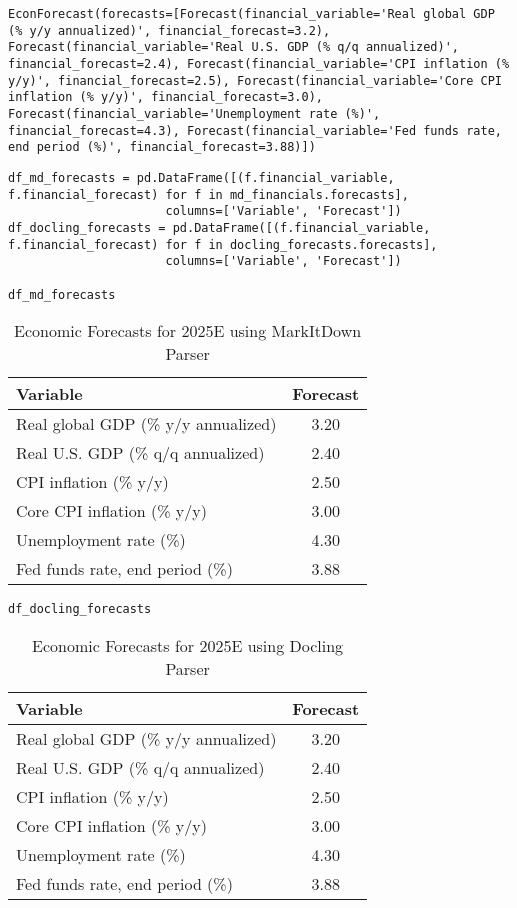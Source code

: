 \begin{verbatim}
EconForecast(forecasts=[Forecast(financial_variable='Real global GDP (% y/y annualized)', financial_forecast=3.2), Forecast(financial_variable='Real U.S. GDP (% q/q annualized)', financial_forecast=2.4), Forecast(financial_variable='CPI inflation (% y/y)', financial_forecast=2.5), Forecast(financial_variable='Core CPI inflation (% y/y)', financial_forecast=3.0), Forecast(financial_variable='Unemployment rate (%)', financial_forecast=4.3), Forecast(financial_variable='Fed funds rate, end period (%)', financial_forecast=3.88)])
\end{verbatim}


\begin{verbatim}
df_md_forecasts = pd.DataFrame([(f.financial_variable, f.financial_forecast) for f in md_financials.forecasts], 
                      columns=['Variable', 'Forecast'])
df_docling_forecasts = pd.DataFrame([(f.financial_variable, f.financial_forecast) for f in docling_forecasts.forecasts], 
                      columns=['Variable', 'Forecast'])

df_md_forecasts
\end{verbatim}



\begin{table}[htbp]
\centering
\begin{tabular}{lc}
\hline
\textbf{Variable} & \textbf{Forecast} \\
\hline
Real global GDP (\% y/y annualized) & 3.20 \\
Real U.S. GDP (\% q/q annualized) & 2.40 \\
CPI inflation (\% y/y) & 2.50 \\
Core CPI inflation (\% y/y) & 3.00 \\
Unemployment rate (\%) & 4.30 \\
Fed funds rate, end period (\%) & 3.88 \\
\hline
\end{tabular}
\caption{Economic Forecasts for 2025E using MarkItDown Parser}
\label{tab:markitdown-forecasts}
\end{table}

\begin{verbatim}
df_docling_forecasts
\end{verbatim}

\begin{table}[htbp]
\centering
\begin{tabular}{lc}
\hline
\textbf{Variable} & \textbf{Forecast} \\
\hline
Real global GDP (\% y/y annualized) & 3.20 \\
Real U.S. GDP (\% q/q annualized) & 2.40 \\
CPI inflation (\% y/y) & 2.50 \\
Core CPI inflation (\% y/y) & 3.00 \\
Unemployment rate (\%) & 4.30 \\
Fed funds rate, end period (\%) & 3.88 \\
\hline
\end{tabular}
\caption{Economic Forecasts for 2025E using Docling Parser}
\label{tab:docling-forecasts}
\end{table}


